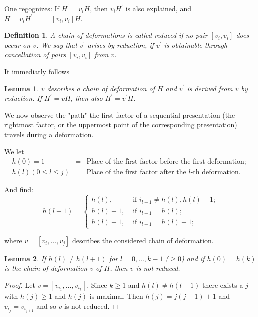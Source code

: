 \documentclass{article}
\newtheorem{lemma}{Lemma}
\newtheorem*{definition}{Definition}
\begin{document}
One regognizes: If $H^{\prime} = v_i H$, then $v_i H^{\prime}$ is also explained, and $H = v_i H^{\prime} == [v_i, v_i] H$.

\begin{definition}
A chain of deformations is called \emph{reduced} if no pair $[v_i, v_i]$ does occur on $v$. We say that $v^{\prime}$ arises by reduction, if $v^{\prime}$ is obtainable through cancellation of pairs $[v_i, v_i]$ from $v$.
\end{definition}

It immediatly follows 

\begin{lemma}
 $v$ describes a chain of deformation of $H$ and $v^{\prime}$ is derived from $v$ by reduction. If $H^{\prime} = vH$, then also $H^{\prime} = v^{\prime}H$.
\end{lemma}

We now observe the "path" the first factor of a sequential presentation (the rightmost factor, or the uppermost point of the corresponding presentation) travels during a deformation.

We let
\[
  \begin{array}{rcl}
    h(0) =  1 & = & \mbox{Place of the first factor before the first deformation; }\\
    h(l) (0 \leq l \le j) & = & \mbox{Place of the first factor after the $l$-th deformation.}
  \end{array}
\]

And find:
\[
  h(l+1)= \begin{cases}
           h(l),     & \mbox{ if $i_{l+1} \neq h(l), h(l) - 1$;} \\
           h(l) + 1, & \mbox{ if $i_{l+1} = h(l)$;} \\
           h(l) -1,  & \mbox{ if $i_{l+1} = h(l) - 1$;}
          \end{cases}
\]

where $v = [v_i, \ldots, v_j]$ describes the considered chain of deformation. 

\begin{lemma}
  If $h(l) \neq h(l + 1)$ for $l = 0, \ldots, k - 1$ ($\geq 0$) and if $h(0) = h(k)$ is the chain of deformation $v$ of $H$, then $v$ is not reduced. 
\end{lemma}

\begin{proof}
  Let $v = [v_{i_1}, \ldots , v_{i_k}]$. Since $k \geq 1$ and $h(l) \neq h(l + 1)$ there exists a $j$ with $h(j) \geq 1$ and $h(j)$ is maximal. Then $h(j) = j(j + 1) + 1$ and $v_{i_j} = v_{i_{j+1}}$ and so $v$ is not reduced.
\end{proof}
\end{document}
